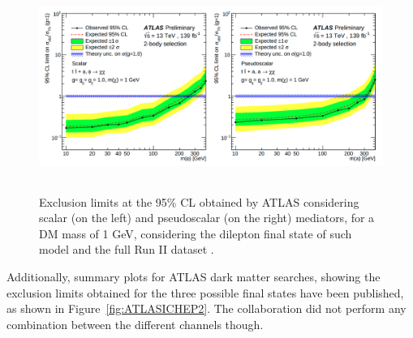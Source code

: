 \documentclass[a4paper, 10pt, openright]{report}
\begin{document}
 \begin{figure}[htbp]
\centering
\includegraphics[width=15cm, height=6.8cm]{figs/ATLASICHEP.png}
\caption{Exclusion limits at the 95\% \ac{CL} obtained by \ac{ATLAS} considering scalar (on the left) and pseudoscalar (on the right) mediators, for a \ac{DM} mass of 1 GeV, considering the dilepton final state of such model and the full Run II dataset \cite{ATLASICHEP2020}.}\label{fig:ATLASICHEP}
\end{figure}

Additionally, summary plots for ATLAS dark matter searches, showing the exclusion limits obtained for the three possible final states have been published, as shown in Figure~\ref{fig:ATLASICHEP2}. The collaboration did not perform any combination between the different channels though.
\end{document}
